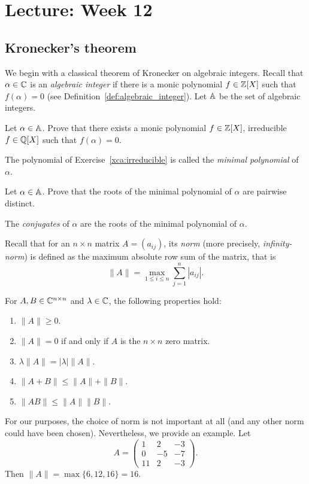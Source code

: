 \section{Lecture: Week 12}

\subsection{Kronecker's theorem}

We begin with a classical theorem of Kronecker on algebraic integers. Recall 
that $\alpha\in\mathbb{C}$ is an \emph{algebraic integer} if there is a monic
polynomial $f\in\mathbb{Z}[X]$ such that $f(\alpha)=0$ (see Definition~\ref{def:algebraic_integer}). Let $\mathbb{A}$ 
be the set of algebraic integers. 

\begin{exercise}
    \label{xca:irreducible}
    Let $\alpha\in\mathbb{A}$. Prove that there exists a monic polynomial $f\in\mathbb{Z}[X]$, 
    irreducible $f\in\mathbb{Q}[X]$ such that $f(\alpha)=0$. 
\end{exercise}

The polynomial of Exercise~\ref{xca:irreducible} is called the \emph{minimal polynomial} of $\alpha$. 

\begin{exercise}
\label{xca:distinct}
    Let $\alpha\in\mathbb{A}$. Prove that the roots of the
    minimal polynomial of $\alpha$ are pairwise distinct. 
\end{exercise}

The \emph{conjugates} of $\alpha$ are the roots of the minimal polynomial of $\alpha$. 

Recall that for an $n\times n$ matrix $A=(a_{ij})$, its \emph{norm} (more precisely, \emph{infinity-norm}) 
is defined 
as the maximum absolute row sum of the matrix, that is 
\[
\|A\|=\max_{1\leq i\leq n}\sum_{j=1}^n|a_{ij}|.
\]

For $A,B\in\mathbb{C}^{n\times n}$ and $\lambda\in\mathbb{C}$, 
the following properties hold: 
\begin{enumerate}
    \item $\|A\|\geq0$.
    \item $\|A\|=0$ if and only if $A$ is the $n\times n$ zero matrix. 
    \item $\lambda\|A\|=|\lambda|\|A\|$. 
    \item $\|A+B\|\leq\|A\|+\|B\|$. 
    \item $\|AB\|\leq\|A\|\|B\|$. 
\end{enumerate}

For our purposes, the choice of norm is not important at all (and any other norm could have been chosen). Nevertheless, we provide an example. Let  
\[
A=\begin{pmatrix}
    1 & 2 & -3\\
    0 &-5 &-7\\
    11 & 2 &-3
\end{pmatrix}.
\]
Then $\|A\|=\max\{6,12,16\}=16$. 

